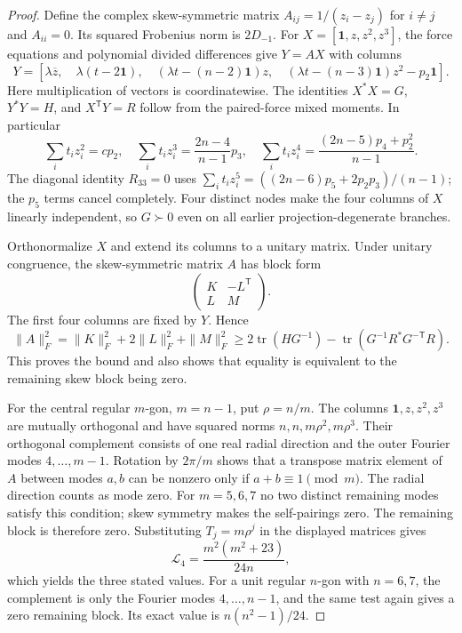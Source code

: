 \documentclass[11pt]{article}
\theoremstyle{remark}
\numberwithin{equation}{section}
\begin{document}
\begin{proof}
Define the complex skew-symmetric matrix
$A_{ij}=1/(z_i-z_j)$ for $i\ne j$ and $A_{ii}=0$.
Its squared Frobenius norm is $2D_{-1}$.
For $X=[\mathbf1,z,z^2,z^3]$, the force equations and polynomial
divided differences give $Y=AX$ with columns
\[
 Y=\left[\lambda\overline z,\quad
          \lambda(t-2\mathbf1),\quad
          (\lambda t-(n-2)\mathbf1)z,\quad
          (\lambda t-(n-3)\mathbf1)z^2-p_2\mathbf1\right].
\]
Here multiplication of vectors is coordinatewise. The identities
$X^*X=G$, $Y^*Y=H$, and $X^{\mathsf T}Y=R$ follow from
the paired-force mixed moments. In particular
\[
 \sum_i t_i z_i^2=cp_2,\quad
 \sum_i t_i z_i^3=\frac{2n-4}{n-1}p_3,\quad
 \sum_i t_i z_i^4=\frac{(2n-5)p_4+p_2^2}{n-1}.
\]
The diagonal identity $R_{33}=0$ uses
$\sum_i t_i z_i^5=((2n-6)p_5+2p_2p_3)/(n-1)$;
the $p_5$ terms cancel completely. Four distinct nodes make the
four columns of $X$ linearly independent, so $G\succ0$ even on
all earlier projection-degenerate branches.

Orthonormalize $X$ and extend its columns to a unitary matrix.
Under unitary congruence, the skew-symmetric matrix $A$ has block form
\[
                 \begin{pmatrix}K&-L^{\mathsf T}\\L&M\end{pmatrix}.
\]
The first four columns are fixed by $Y$. Hence
\[
 \|A\|_F^2=\|K\|_F^2+2\|L\|_F^2+\|M\|_F^2
 \ge2\operatorname{tr}(HG^{-1})
       -\operatorname{tr}(G^{-1}R^*G^{-\mathsf T}R).
\]
This proves the bound and also shows that equality is equivalent
to the remaining skew block being zero.

For the central regular $m$-gon, $m=n-1$, put $\rho=n/m$.
The columns $\mathbf1,z,z^2,z^3$ are mutually orthogonal and have
squared norms $n,n,m\rho^2,m\rho^3$.
Their orthogonal complement consists of one real radial direction
and the outer Fourier modes $4,\ldots,m-1$.
Rotation by $2\pi/m$ shows that a transpose matrix element of $A$
between modes $a,b$ can be nonzero only if
$a+b\equiv1\pmod m$. The radial direction counts as mode zero.
For $m=5,6,7$ no two distinct remaining modes satisfy this condition;
skew symmetry makes the self-pairings zero. The remaining block is
therefore zero. Substituting $T_j=m\rho^j$ in the displayed matrices
gives
\[
 \mathcal L_4=\frac{m^2(m^2+23)}{24n},
\]
which yields the three stated values.
For a unit regular $n$-gon with $n=6,7$, the complement is only
the Fourier modes $4,\ldots,n-1$, and the same test again gives
a zero remaining block. Its exact value is $n(n^2-1)/24$.
\end{proof}
\end{document}
